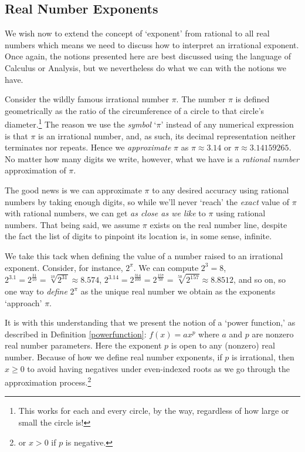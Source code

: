 \documentclass{ximera}
\begin{document}
\subsection{Real Number Exponents}

We wish now to extend the concept of `exponent' from rational to all real numbers which means we need to discuss how to interpret an irrational exponent.  Once again, the notions presented here are best discussed using the language of Calculus or Analysis, but we nevertheless do what we can with the notions we have.  

Consider  the wildly famous irrational number $\pi$.  The number $\pi$ is defined geometrically as the ratio of the circumference of a circle to that circle's diameter.\footnote{This works for each and every circle, by the way, regardless of how large or small the circle is!} The reason we use the \textit{symbol} `$\pi$' instead of any numerical expression is that $\pi$ is an irrational number, and, as such, its decimal representation neither terminates nor repeats.  Hence we \textit{approximate} $\pi$ as $\pi \approx 3.14$ or $\pi \approx 3.14159265$.  No matter how many digits we write, however, what we have is a \textit{rational number} approximation of $\pi$. 


The good news is we can approximate $\pi$ to any desired accuracy using rational numbers by taking enough digits, so while we'll never `reach' the \textit{exact} value of $\pi$ with rational numbers, we can get \textit{as close as we like} to $\pi$ using rational numbers.  That being said, we assume $\pi$ exists on the real number line, despite the fact the list of digits to pinpoint its location is, in some sense, infinite.

We take this tack  when defining the value of a number raised to an irrational exponent.  Consider, for instance, $2^{\pi}$.  We can compute $2^3 = 8$, $2^{3.1} = 2^{\frac{31}{10}} = \sqrt[10]{2^{31}} \approx 8.574 $, $2^{3.14} = 2^{\frac{314}{100}} = 2^{\frac{157}{50}} = \sqrt[50]{2^{157}} \approx 8.8512$, and so on, so one way to  \textit{define} $2^{\pi}$ as the unique real number we obtain  as the exponents `approach' $\pi$. 

It is with this understanding that we present the notion of a `power function,' as described in Definition   \ref{powerfunction}:  $f(x) = a x^p$ where $a$ and $p$ are nonzero real number parameters.  Here the exponent $p$ is open to any (nonzero) real number.  Because of how we define real number exponents, if $p$ is irrational, then $ x \geq 0$ to avoid having negatives under even-indexed roots as we go through the approximation process.\footnote{or $x > 0$ if $p$ is negative.} 
\end{document}
